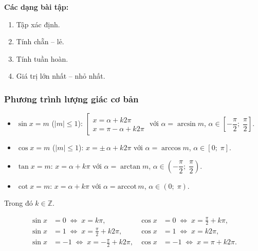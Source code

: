 \documentclass[12pt,a4paper]{article}
\begin{document}
\medskip\noindent\textbf{Các dạng bài tập:}
\begin{enumerate}[label=\textbf{Dạng \arabic*:}, leftmargin=*, align=left]
  \item Tập xác định.
  \item Tính chẵn -- lẻ.
  \item Tính tuần hoàn.
  \item Giá trị lớn nhất -- nhỏ nhất.
\end{enumerate}

\subsubsection{Phương trình lượng giác cơ bản}

\begin{congthuc}
  \begin{itemize}
    \item $\sin x = m$ \;($|m| \le 1$):
      \;$\left[\begin{array}{l}
        x = \alpha + k2\pi \\
        x = \pi - \alpha + k2\pi
      \end{array}\right.$
      với $\alpha = \arcsin m$, \;$\alpha \in \left[-\dfrac{\pi}{2};\;\dfrac{\pi}{2}\right]$.

    \item $\cos x = m$ \;($|m| \le 1$):
      \;$x = \pm\,\alpha + k2\pi$
      \;với $\alpha = \arccos m$, \;$\alpha \in [0;\;\pi]$.

    \item $\tan x = m$:
      \;$x = \alpha + k\pi$
      \;với $\alpha = \arctan m$, \;$\alpha \in \left(-\dfrac{\pi}{2};\;\dfrac{\pi}{2}\right)$.

    \item $\cot x = m$:
      \;$x = \alpha + k\pi$
      \;với $\alpha = \text{arccot}\, m$, \;$\alpha \in (0;\;\pi)$.
  \end{itemize}
  Trong đó $k \in \mathbb{Z}$.
\end{congthuc}

\begin{congthuc}[title={Các trường hợp đặc biệt}]
  \begin{align}
    \sin x &= 0 \;\Leftrightarrow\; x = k\pi, &
    \cos x &= 0 \;\Leftrightarrow\; x = \frac{\pi}{2} + k\pi, \\
    \sin x &= 1 \;\Leftrightarrow\; x = \frac{\pi}{2} + k2\pi, &
    \cos x &= 1 \;\Leftrightarrow\; x = k2\pi, \\
    \sin x &= -1 \;\Leftrightarrow\; x = -\frac{\pi}{2} + k2\pi, &
    \cos x &= -1 \;\Leftrightarrow\; x = \pi + k2\pi.
  \end{align}
\end{congthuc}
\end{document}
